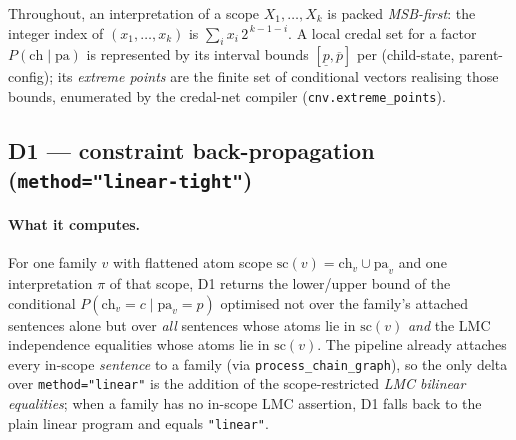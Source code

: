 \documentclass[11pt]{article}
\begin{document}
Throughout, an interpretation of a scope $X_1,\dots,X_k$ is packed \emph{MSB-first}: the
integer index of $(x_1,\dots,x_k)$ is $\sum_i x_i\,2^{\,k-1-i}$. A local credal set for a
factor $P(\mathrm{ch}\mid\mathrm{pa})$ is represented by its interval bounds
$[\underline p,\overline p]$ per (child-state, parent-config); its \emph{extreme points} are
the finite set of conditional vectors realising those bounds, enumerated by the credal-net
compiler (\texttt{cnv.extreme\_points}).

\subsection{D1 --- constraint back-propagation (\texttt{method="linear-tight"})}
\label{sec:d1-detail}

\paragraph{What it computes.} For one family $v$ with flattened atom scope
$\mathrm{sc}(v)=\mathrm{ch}_v\cup\mathrm{pa}_v$ and one interpretation $\pi$ of that scope, D1
returns the lower/upper bound of the conditional $P(\mathrm{ch}_v{=}c\mid\mathrm{pa}_v{=}p)$
optimised not over the family's attached sentences alone but over \emph{all} sentences whose
atoms lie in $\mathrm{sc}(v)$ \emph{and} the LMC independence equalities whose atoms lie in
$\mathrm{sc}(v)$. The pipeline already attaches every in-scope \emph{sentence} to a family
(via \texttt{process\_chain\_graph}), so the only delta over \texttt{method="linear"} is the
addition of the scope-restricted \emph{LMC bilinear equalities}; when a family has no in-scope
LMC assertion, D1 falls back to the plain linear program and equals \texttt{"linear"}.
\end{document}
